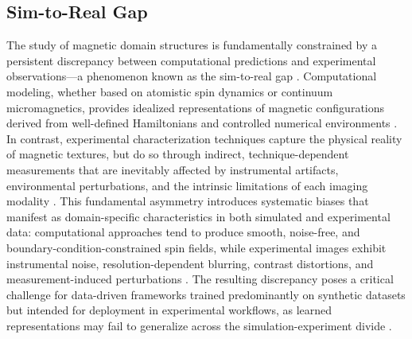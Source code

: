 \documentclass[letterpaper, 12, one column]{article}
\begin{document}
\subsection{Sim-to-Real Gap}\label{sec:sim2real}

The study of magnetic domain structures is fundamentally constrained by a persistent discrepancy between computational predictions and experimental observations—a phenomenon known as the sim-to-real gap \cite{Wagenmaker2024SimToReal}. Computational modeling, whether based on atomistic spin dynamics or continuum micromagnetics, provides idealized representations of magnetic configurations derived from well-defined Hamiltonians and controlled numerical environments \cite{MacielDeMenezes2021Skyrmionics}. In contrast, experimental characterization techniques capture the physical reality of magnetic textures, but do so through indirect, technique-dependent measurements that are inevitably affected by instrumental artifacts, environmental perturbations, and the intrinsic limitations of each imaging modality \cite{Nistico2020Magnetic}. This fundamental asymmetry introduces systematic biases that manifest as domain-specific characteristics in both simulated and experimental data: computational approaches tend to produce smooth, noise-free, and boundary-condition-constrained spin fields, while experimental images exhibit instrumental noise, resolution-dependent blurring, contrast distortions, and measurement-induced perturbations \cite{Feng2024}. The resulting discrepancy poses a critical challenge for data-driven frameworks trained predominantly on synthetic datasets but intended for deployment in experimental workflows, as learned representations may fail to generalize across the simulation-experiment divide \cite{Hilgers2025}.
\end{document}

